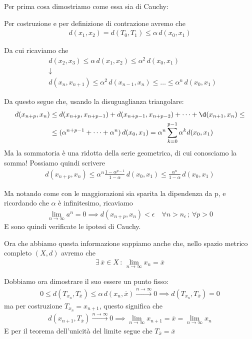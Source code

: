 Per prima cosa dimostriamo come essa sia di Cauchy:

Per costruzione e per definizione di contrazione avremo che
\begin{align}
d(x_1,x_2)= d(T_0,T_1)\leq \alpha \, d(x_0,x_1)
\end{align}

Da cui ricaviamo che 
\begin{align}
{}&d(x_2,x_3) \leq \alpha \, d(x_1,x_2) \leq \alpha^2 \, d(x_0,x_1) \nonumber \\
&\downarrow \nonumber \\
&d(x_n,x_{n+1}) \leq \alpha^2 \, d(x_{n-1},x_n) \leq \dots \leq \alpha^n \, d(x_0,x_1)
\end{align}

Da questo segue che, usando la disuguaglianza triangolare:
\begin{align}
d(x_{n+p}, x_n) {}&\leq d(x_{n+p}, x_{n+p-1}) + d(x_{n+p-1}, x_{n+p-2})  + \dots + \d(x_{n+1}, x_{n}) \leq \nonumber \\
& \leq (\alpha^{n+p-1} + \dots + \alpha^{n}) \, d(x_0,x_1)= \alpha^n \sum_{k=0}^{p-1}\alpha^k d(x_0,x_1) 
\end{align}
Ma la sommatoria è una ridotta della serie geometrica, di cui conosciamo la somma! Possiamo quindi scrivere
\begin{align}
d(x_{n+p}, x_n)  \leq  \alpha^n \frac{1-\alpha^{p-1}}{1-\alpha} \, d(x_0,x_1) \leq \frac{\alpha^n}{1-\alpha} \, d(x_0,x_1)
\end{align}

Ma notando come con le maggiorazioni sia sparita la dipendenza da p, e ricordando che $\alpha$ è infinitesimo, ricaviamo
\begin{align}
\underset{n\rightarrow \infty}{\lim}a^n=0 \implies d(x_{n+p}, x_n) < \epsilon \quad \forall n>n_\epsilon \, ; \, \forall p>0
\end{align}
E sono quindi verificate le ipotesi di Cauchy.

\newpage

Ora che abbiamo questa informazione sappiamo anche che, nello spazio metrico completo $(X,d)$ avremo che 
\begin{align}
\exists \, \overline{x} \in X \, : \, \underset{n\rightarrow \infty}{\lim}x_n= \overline{x}
\end{align}

Dobbiamo ora dimostrare il suo essere un punto fisso:
\begin{align}
0 \leq d(T_{x_n}, T_{\overline{x}}) \leq \alpha \, d(x_n, \overline{x})\overset{n\rightarrow \infty}{\longrightarrow}0 \implies d(T_{x_n}, T_{\overline{x}}) =0
\end{align} 
ma per costruzione $T_{x_n}=x_{n+1}$, questo significa che
\begin{align}
 d(x_{n+1}, T_{\overline{x}})\overset{n\rightarrow \infty}{\longrightarrow}0 \implies \underset{n\rightarrow \infty}{\lim}x_{n+1}= \overline{x} = \underset{n\rightarrow \infty}{\lim}x_n
\end{align}
E per il teorema dell'unicità del limite segue che $T_{\overline{x}}=\overline{x}$


